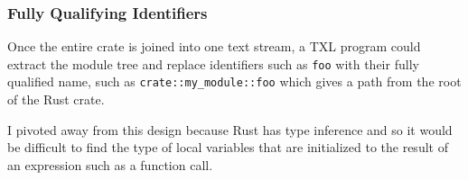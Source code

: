 \documentclass[11pt]{article}
\begin{document}
\subsubsection{Fully Qualifying Identifiers}

Once the entire crate is joined into one text stream, a TXL program could extract the module tree and replace identifiers such as \lstinline{foo} with their fully qualified name, such as \lstinline{crate::my_module::foo} which gives a path from the root of the Rust crate.

I pivoted away from this design because Rust has type inference and so it would be difficult to find the type of local variables that are initialized to the result of an expression such as a function call.





\end{document}
